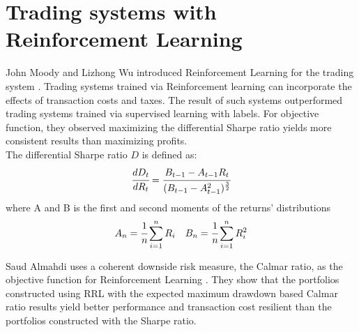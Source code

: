 \section{Trading systems with Reinforcement Learning}
John Moody and Lizhong Wu introduced Reinforcement Learning for the trading system \cite{618952}. Trading systems trained via Reinforcement learning can incorporate the effects of transaction costs and taxes. The result of such systems outperformed trading systems trained via supervised learning with labels. For objective function, they observed maximizing the differential Sharpe ratio yields more consistent results than maximizing profits\cite{618952,moody1998performance}.\\
The differential Sharpe ratio \(D\) is defined as:
\[
\cfrac{d D_t}{d R_t} = 
\cfrac{B_{t-1}-A_{t-1} R_t}{(B_{t-1}-A_{t-1}^2)^\frac{3}{2}}
\]
where
A and B is the first and second moments of the returns' distributions
\[ A_n = \cfrac{1}{n}\sum_{i=1}^nR_i\quad
B_n = \cfrac{1}{n}\sum_{i=1}^nR_i^2
\]

Saud Almahdi uses a coherent downside risk measure, the Calmar ratio,  as the objective function for Reinforcement Learning \cite{AdaptivePortfolioTradingSystem}. They show that the portfolios constructed using RRL with the expected maximum drawdown based Calmar ratio results yield better performance and transaction cost resilient than the portfolios constructed with the Sharpe ratio. 